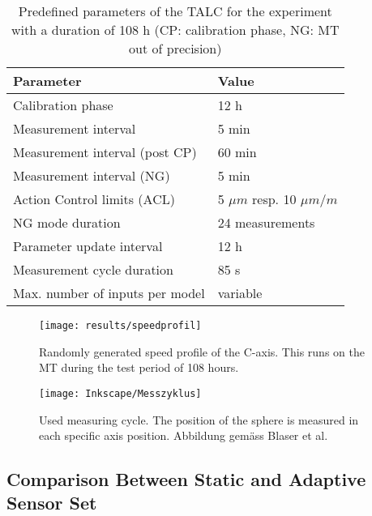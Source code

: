 \begin{table}[!htb]
\centering
\begin{threeparttable}
\caption[Experiment parameters]{Predefined parameters of the TALC for the experiment with a duration of 108 h (CP: calibration phase, NG: MT out of precision)}
\begin{tabular}{l l}
\hline
Parameter \hspace{7cm} & Value\\
  \hline
 Calibration phase & 12 h\\
 Measurement interval & 5 min\\
 Measurement interval (post CP) & 60 min\\
 Measurement interval (NG) & 5 min\\
 Action Control limits (ACL) & 5 $\mu m$ resp. 10 $\mu m/m$\\
 NG mode duration & 24 measurements\\
 Parameter update interval & 12 h\\
 Measurement cycle duration & 85 s\\
 Max. number of inputs per model & variable\\
\hline
\end{tabular}
\label{Tab:Experimental_setup}
\end{threeparttable}
\end{table}





\begin{figure}[!htb]
    \centering
    \texttt{[image: results/speedprofil]} %
    \caption[Speed profile]{Randomly generated speed profile of the C-axis. This runs on the MT during the test period of 108 hours.}
    \label{fig:speedprofil}
\end{figure}



\begin{figure}[!htb]
    \centering
    \texttt{[image: Inkscape/Messzyklus]} %
    \caption[Measuring cycle]{Used measuring cycle. The position of the sphere is measured in each specific axis position. Abbildung gemäss Blaser et al. \cite{Blaser_2017}}
    \label{fig:messzyklus.}
\end{figure}


\subsection{Comparison Between Static and Adaptive Sensor Set}
\label{sec:comparison_static_adaptive}


